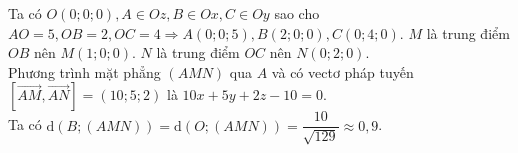 \begin{ex}
{\begin{center}
		\end{center}
		Ta có $O(0 ; 0 ; 0), A \in {Oz}, B \in O x, C \in O y$ sao cho $A O=5, OB=2, OC=4\Rightarrow A(0 ; 0 ; 5), B(2 ; 0 ; 0), C(0 ; 4 ; 0)$. $M$ là trung điểm $OB$ nên $M(1 ; 0 ; 0)$. $N$ là trung điểm $OC$ nên $N(0 ; 2 ; 0)$.\\
		Phương trình mặt phẳng $(AMN)$ qua $A$ và có vectơ pháp tuyến $[\overrightarrow{AM},\overrightarrow{AN}]=(10;5;2)$ là $10x + 5y + 2z - 10 = 0$.\\
		Ta có $\mathrm{d}(B;(AMN))=\mathrm{d}(O;(AMN))=\dfrac{10}{\sqrt{129}}\approx 0{,}9$.
		
	}
\end{ex}

